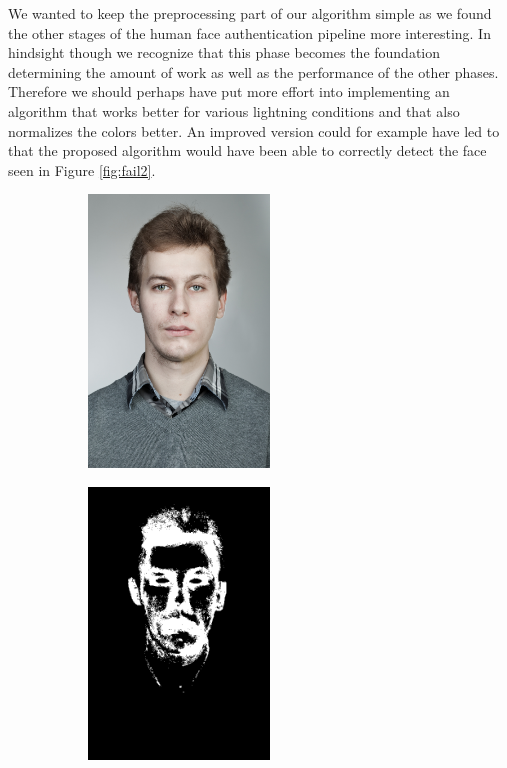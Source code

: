 
We wanted to keep the preprocessing part of our algorithm simple as we found the other stages of the human face authentication pipeline more interesting. In hindsight though we recognize that this phase becomes the foundation determining the amount of work as well as the performance of the other phases. Therefore we should perhaps have put more effort into implementing an algorithm that works better for various lightning conditions and that also normalizes the colors better. An improved version could for example have led to that the proposed algorithm would have been able to correctly detect the face seen in Figure \ref{fig:fail2}. 

\begin{figure}[H]
\centering

\begin{subfigure}{.25\textwidth}
  \centering
  \includegraphics[width=0.53\textwidth]{img/fd3/fail2_input.jpg}
  \caption{}
\end{subfigure}%
\begin{subfigure}{.25\textwidth}
  \centering
  \includegraphics[width=0.53\textwidth]{img/fd3/fail2_estimatedSkinMak.png}

\end{subfigure}
\end{figure}
